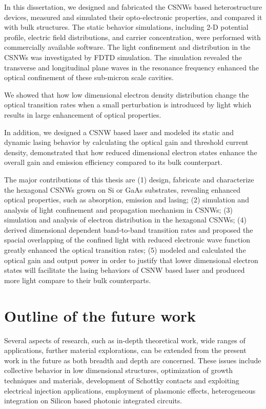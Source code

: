In this dissertation, we designed and fabricated the CSNWs based
heterostructure devices, measured and simulated their opto-electronic
properties, and compared it with bulk structures. The static behavior
simulations, including 2-D potential profile, electric field distributions, and
carrier concentration, were performed with commercially available software. The
light confinement and distribution in the CSNWs was investigated by FDTD
simulation. The simulation revealed the transverse and longitudinal plane waves
in the resonance frequency enhanced the optical confinement of these sub-micron
scale cavities.

We showed that how low dimensional electron density distribution change the
optical transition rates when a small perturbation is introduced by light which
results in large enhancement of optical properties.

In addition, we designed a CSNW based laser and modeled its static and dynamic
lasing behavior by calculating the optical gain and threshold current density,
demonstrated that how reduced dimensional electron states enhance the overall
gain and emission efficiency compared to its bulk counterpart.

The major contributions of this thesis are (1) design, fabricate and
characterize the hexagonal CSNWs grown on Si or GaAs substrates, revealing
enhanced optical properties, such as absorption, emission and lasing; (2)
simulation and analysis of light confinement and propagation mechanism in
CSNWs; (3) simulation and analysis of electron distribution in the hexagonal
CSNWs; (4) derived dimensional dependent band-to-band transition rates and
proposed the spacial overlapping of the confined light with reduced electronic
wave function greatly enhanced the optical transition rates; (5) modeled and
calculated the optical gain and output power in order to justify that lower
dimensional electron states will facilitate the lasing behaviors of CSNW based
laser and produced more light compare to their bulk counterparts.

\section{Outline of the future work}

Several aspects of research, such as in-depth theoretical work, wide ranges of
applications, further material explorations, can be extended from the present
work in the future as both breadth and depth are concerned. These issues
include collective behavior in low dimensional structures, optimization of
growth techniques and materials, development of Schottky contacts and
exploiting electrical injection applications, employment of plasmonic effects,
heterogeneous integration on Silicon based photonic integrated circuits.

